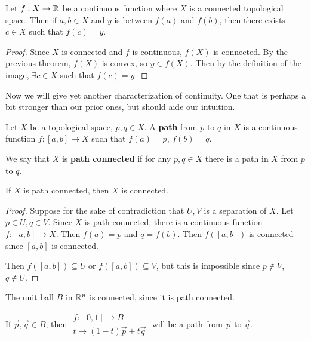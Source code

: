 \documentclass[12pt, twosided]{article}
\begin{document}
\begin{thm}
  Let \(f: X \to \mathbb{R}\) be a continuous function where \(X\) is a connected topological space. Then if \(a, b\in X\) and \(y\) is between \(f(a)\) and \(f(b)\), then there exists \(c \in X\) such that \(f(c) = y\). 
\end{thm}

\begin{proof}
  Since \(X\) is connected and \(f\) is continuous, \(f(X)\) is connected. By the previous theorem, \(f(X)\) is convex, so \(y \in f(X)\). Then by the definition of the image, \(\exists c \in X\) such that \(f(c) = y\).
\end{proof}

Now we will give yet another characterization of continuity. One that is perhaps a bit stronger than our prior ones, but should aide our intuition.

\begin{df}
  Let \(X\) be a topological space, \(p, q \in X\). A \textbf{path} from \(p\) to \(q\) in \(X\) is a continuous function \(f:[a,b] \to X\) such that \(f(a) = p\), \(f(b) = q\).

  We say that \(X\) is \textbf{path connected} if for any \(p,q\in X\) there is a path in \(X\) from \(p\) to \(q\).
\end{df}


\begin{prop}
  If \(X\) is path connected, then \(X\) is connected.
\end{prop}

\begin{proof}
  Suppose for the sake of contradiction that \(U, V\) is a separation of \(X\). Let \(p \in U, q \in V\). Since \(X\) is path connected, there is a continuous function \(f:[a,b] \to X\). Then \(f(a) = p\) and \(q = f(b)\). Then \(f([a,b])\) is connected since \([a,b]\) is connected.

  Then \(f([a,b]) \subseteq U\) or \(f([a,b])\subseteq V\), but this is impossible since \(p\not\in V\), \(q \not\in U\).
\end{proof}

\begin{exa}
  The unit ball \(B\) in \(\mathbb{R}^n\) is connected, since it is path connected.

  If \(\vec{p},\vec{q} \in B\), then \(
  \begin{matrix}
    f:[0,1] \to B \\ t \mapsto (1-t)\vec{p} + t\vec{q}
  \end{matrix}\) will be a path from \(\vec{p}\) to \(\vec{q}\).
\end{exa}
\end{document}
